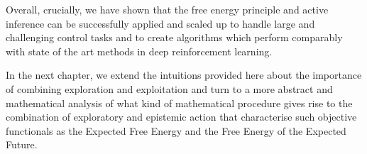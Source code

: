 Overall, crucially, we have shown that the free energy principle and active inference can be successfully applied and scaled up to handle large and challenging control tasks and to create algorithms which perform comparably with state of the art methods in deep reinforcement learning.

In the next chapter, we extend the intuitions provided here about the importance of combining exploration and exploitation and turn to a more abstract and mathematical analysis of what kind of mathematical procedure gives rise to the combination of exploratory and epistemic action that characterise such objective functionals as the Expected Free Energy and the Free Energy of the Expected Future. 